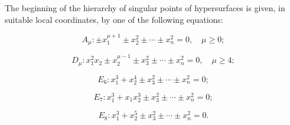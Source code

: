 The beginning of the hierarchy of singular points of hypersurfaces is given, in suitable local coordinates, by one of the following equations:

$$A_{\mu}: \pm x_1^{\mu+1} \pm x_2^2 \pm \cdots \pm x_n^2 = 0, \quad \mu \geq 0;$$

$$D_{\mu}: x_1^2 x_2 \pm x_2^{\mu-1} \pm x_3^2 \pm \cdots \pm x_n^2 = 0, \quad \mu \geq 4;$$

$$E_6: x_1^3 + x_2^4 \pm x_3^2 \pm \cdots \pm x_n^2 = 0;$$

$$E_7: x_1^3 + x_1 x_2^3 \pm x_3^2 \pm \cdots \pm x_n^2 = 0;$$

$$E_8: x_1^3 + x_2^5 \pm x_3^2 \pm \cdots \pm x_n^2 = 0.$$
